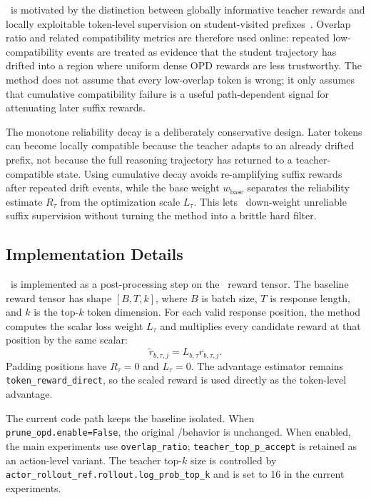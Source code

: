\method~is motivated by the distinction between globally informative teacher rewards and locally exploitable token-level supervision on student-visited prefixes~\citep{li2026rethinking}.
Overlap ratio and related compatibility metrics are therefore used online: repeated low-compatibility events are treated as evidence that the student trajectory has drifted into a region where uniform dense OPD rewards are less trustworthy.
The method does not assume that every low-overlap token is wrong; it only assumes that cumulative compatibility failure is a useful path-dependent signal for attenuating later suffix rewards.

The monotone reliability decay is a deliberately conservative design.
Later tokens can become locally compatible because the teacher adapts to an already drifted prefix, not because the full reasoning trajectory has returned to a teacher-compatible state.
Using cumulative decay avoids re-amplifying suffix rewards after repeated drift events, while the base weight $w_{\mathrm{base}}$ separates the reliability estimate $R_{\tau}$ from the optimization scale $L_{\tau}$.
This lets \method~down-weight unreliable suffix supervision without turning the method into a brittle hard filter.


\subsection{Implementation Details}

\method~is implemented as a post-processing step on the \opd~reward tensor.
The baseline reward tensor has shape $[B,T,k]$, where $B$ is batch size, $T$ is response length, and $k$ is the top-$k$ token dimension.
For each valid response position, the method computes the scalar loss weight $L_{\tau}$ and multiplies every candidate reward at that position by the same scalar:
\begin{equation}
    \widetilde{r}_{b,\tau,j}=L_{b,\tau}r_{b,\tau,j}.
\end{equation}
Padding positions have $R_{\tau}=0$ and $L_{\tau}=0$.
The advantage estimator remains \texttt{token\_reward\_direct}, so the scaled reward is used directly as the token-level advantage.

The current code path keeps the baseline isolated.
When \texttt{prune\_opd.enable=False}, the original \opd/\grpo behavior is unchanged.
When enabled, the main experiments use \texttt{overlap\_ratio}; \texttt{teacher\_top\_p\_accept} is retained as an action-level variant.
The teacher top-$k$ size is controlled by \texttt{actor\_rollout\_ref.rollout.log\_prob\_top\_k} and is set to 16 in the current experiments.


